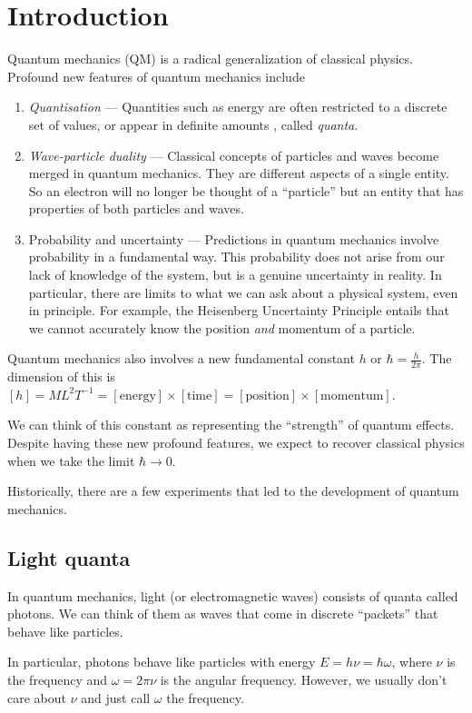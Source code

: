 \documentclass[a4paper]{article}
\begin{document}
\section{Introduction}
Quantum mechanics (QM) is a radical generalization of classical physics. Profound new features of quantum mechanics include
\begin{enumerate}
  \item \emph{Quantisation} --- Quantities such as energy are often restricted to a discrete set of values, or appear in definite amounts , called \emph{quanta}.
  \item \emph{Wave-particle duality} --- Classical concepts of particles and waves become merged in quantum mechanics. They are different aspects of a single entity. So an electron will no longer be thought of a ``particle'' but an entity that has properties of both particles and waves.
  \item Probability and uncertainty --- Predictions in quantum mechanics involve probability in a fundamental way. This probability does not arise from our lack of knowledge of the system, but is a genuine uncertainty in reality. In particular, there are limits to what we can ask about a physical system, even in principle. For example, the Heisenberg Uncertainty Principle entails that we cannot accurately know the position \emph{and} momentum of a particle.
\end{enumerate}
Quantum mechanics also involves a new fundamental constant $h$ or $\hbar = \frac{h}{2\pi}$. The dimension of this is $[h] = ML^2T^{-1} = [\text{energy}]\times [\text{time}] = [\text{position}] \times [\text{momentum}]$.

We can think of this constant as representing the ``strength'' of quantum effects. Despite having these new profound features, we expect to recover classical physics when we take the limit $\hbar \to 0$.

Historically, there are a few experiments that led to the development of quantum mechanics.
\subsection{Light quanta}
In quantum mechanics, light (or electromagnetic waves) consists of quanta called photons. We can think of them as waves that come in discrete ``packets'' that behave like particles.

In particular, photons behave like particles with energy $E = h \nu = \hbar \omega$, where $\nu$ is the frequency and $\omega = 2\pi \nu$ is the angular frequency. However, we usually don't care about $\nu$ and just call $\omega$ the frequency.
\end{document}
